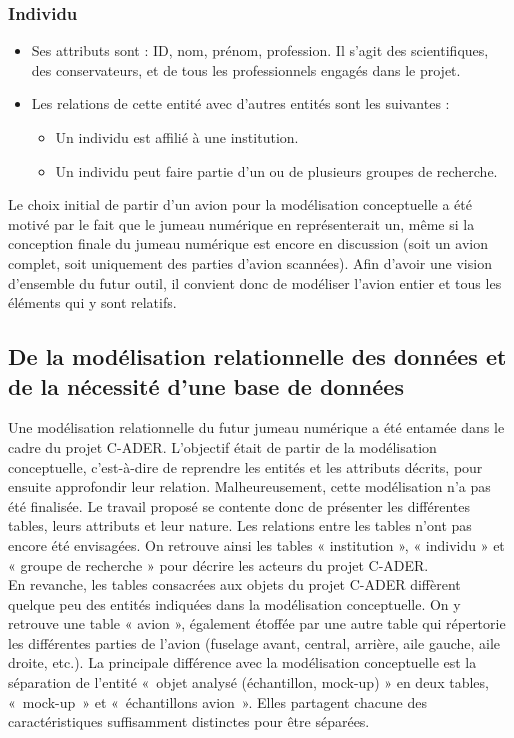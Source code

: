 \subsubsection{Individu}
\begin{itemize}
    \item Ses attributs sont : ID, nom, prénom, profession. Il s’agit des scientifiques, des conservateurs, et de tous les professionnels engagés dans le projet.
    \item Les relations de cette entité avec d’autres entités sont les suivantes :
    \begin{itemize}
        \item Un individu est affilié à une institution.
        \item Un individu peut faire partie d’un ou de plusieurs groupes de recherche.
    \end{itemize}
\end{itemize}

Le choix initial de partir d'un avion pour la modélisation conceptuelle a été motivé par le fait que le jumeau numérique en représenterait un, même si la conception finale du jumeau numérique est encore en discussion (soit un avion complet, soit uniquement des parties d’avion scannées). Afin d'avoir une vision d'ensemble du futur outil, il convient donc de modéliser l'avion entier et tous les éléments qui y sont relatifs. 

        \subsection{De la modélisation relationnelle des données et de la nécessité d’une base de données}
      
Une modélisation relationnelle du futur jumeau numérique a été entamée dans le cadre du projet C-ADER. L’objectif était de partir de la modélisation conceptuelle, c’est-à-dire de reprendre les entités et les attributs décrits, pour ensuite approfondir leur relation. Malheureusement, cette modélisation n’a pas été finalisée. Le travail proposé se contente donc de présenter les différentes tables, leurs attributs et leur nature. Les relations entre les tables n’ont pas encore été envisagées.
On retrouve ainsi les tables « institution », « individu » et « groupe de recherche » pour décrire les acteurs du projet C-ADER.\\

En revanche, les tables consacrées aux objets du projet C-ADER diffèrent quelque peu des entités indiquées dans la modélisation conceptuelle. On y retrouve une table « avion », également étoffée par une autre table qui répertorie les différentes parties de l’avion (fuselage avant, central, arrière, aile gauche, aile droite, etc.). La principale différence avec la modélisation conceptuelle est la séparation de l’entité « objet analysé (échantillon, mock-up) » en deux tables, « mock-up » et « échantillons avion ». Elles partagent chacune des caractéristiques suffisamment distinctes pour être séparées.\\
 
